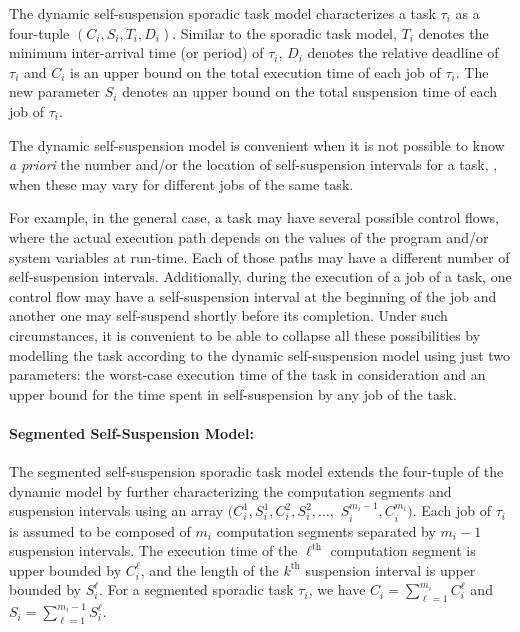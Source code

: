 The {dynamic} self-suspension sporadic task model characterizes a task $\tau_i$ as a four-tuple $(C_i,S_i,T_i,D_i)$. Similar to the sporadic task model, $T_i$ denotes the 
minimum inter-arrival time (or period) of $\tau_i$, $D_i$ denotes the relative deadline of $\tau_i$ and $C_i$ is an upper bound on 
the total execution time of each job of $\tau_i$. The new parameter $S_i$ denotes an upper bound on the total suspension time of each job of $\tau_i$.  

The dynamic self-suspension model is convenient when it is not possible to know \textit{a priori} the number and/or the location of self-suspension intervals for a task, \eg, when these may vary for different jobs of the same task.

For example, in the general case, a task may have several possible control flows, where the actual execution path depends on the values
of the program and/or system variables at run-time. Each of those paths may have a different
number of self-suspension intervals. Additionally, during the execution of a job of a task, one control flow may have a self-suspension interval at the beginning of the job and
another one may self-suspend shortly before its completion. Under such circumstances, it is convenient to be able to collapse all these possibilities
by modelling the task according to the dynamic self-suspension model using
just two parameters: the worst-case execution time of the task in consideration and an upper bound for the time spent in self-suspension by any job of the task. %

\paragraph{Segmented Self-Suspension Model:} 

The {segmented} self-suspension sporadic task model extends the four-tuple of the dynamic model by further characterizing the computation segments and suspension 
intervals using an array $(C_{i}^1,S_{i}^1,C_{i}^2,S_{i}^2,\ldots, $ $S_{i}^{m_i-1},C_{i}^{m_i})$. Each job of $\tau_i$ is assumed to be composed of $m_i$ computation segments 
separated by $m_i-1$ suspension intervals. The execution time of the $\ell^{\text{th}}$ computation segment is upper bounded by  $C_{i}^{\ell}$, and the length of the $k^{\text{th}}$ suspension interval is upper bounded by $S_{i}^{\ell}$. For a segmented sporadic task $\tau_i$, we have 
$C_i = \sum_{\ell=1}^{m_i} C_i^\ell$ and $S_i=\sum_{\ell=1}^{m_i-1} S_i^\ell$.

